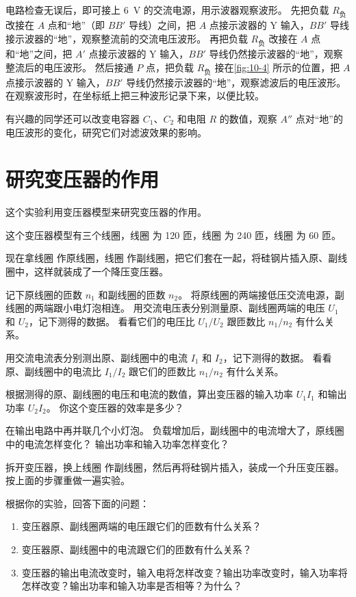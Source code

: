 电路检查无误后，即可接上 \qty{6}{V} 的交流电源，用示波器观察波形。
先把负载 $R_{\text{负}}$ 改接在 $A$ 点和“地”（即 $BB'$ 导线）之间，把 $A$ 点接示波器的 Y 输入，$BB'$ 导线接示波器的“地”，观察整流前的交流电压波形。
再把负载 $R_{\text{负}}$ 改接在 $A$ 点和“地”之间，把 $A'$ 点接示波器的 Y 输入，$BB'$ 导线仍然接示波器的“地”，观察整流后的电压波形。
然后接通 $P$ 点，把负载 $R_{\text{负}}$ 接在\cref{fig:10-4} 所示的位置，把 $A$ 点接示波器的 Y 输入，$BB'$ 导线仍然接示波器的“地”，观察滤波后的电压波形。
在观察波形时，在坐标纸上把三种波形记录下来，以便比较。

有兴趣的同学还可以改变电容器 $C_1$、$C_2$ 和电阻 $R$ 的数值，观察 $A''$ 点对“地”的电压波形的变化，研究它们对滤波效果的影响。

\section{研究变压器的作用}
这个实验利用变压器模型来研究变压器的作用。

这个变压器模型有三个线圈，线圈  为 120 匝，线圈  为 240 匝，线圈  为 60 匝。

现在拿线圈  作原线圈，线圈  作副线圈，把它们套在一起，将硅钢片插入原、副线圈中，这样就装成了一个降压变压器。

记下原线圈的匝数 $n_1$ 和副线圈的匝数 $n_2$。
将原线圈的两端接低压交流电源，副线圈的两端跟小电灯泡相连。
用交流电压表分别测量原、副线圈两端的电压 $U_1$ 和 $U_2$，记下测得的数据。
看看它们的电压比 $U_1/U_2$ 跟匝数比 $n_1/n_2$ 有什么关系。

用交流电流表分别测出原、副线圈中的电流 $I_1$ 和 $I_2$，记下测得的数据。
看看原、副线圈中的电流比 $I_1/I_2$ 跟它们的匝数比 $n_1/n_2$ 有什么关系。

根据测得的原、副线圈的电压和电流的数值，算出变压器的输入功率 $U_1I_1$ 和输出功率 $U_2I_2$。
你这个变压器的效率是多少？

在输出电路中再并联几个小灯泡。
负载增加后，副线圈中的电流增大了，原线圈中的电流怎样变化？
输出功率和输入功率怎样变化？

拆开变压器，换上线圈  作副线圈，然后再将硅钢片插入，装成一个升压变压器。
按上面的步骤重做一遍实验。

根据你的实验，回答下面的问题：
\begin{enumerate}
  \item 变压器原、副线圈两端的电压跟它们的匝数有什么关系？
  \item 变压器原、副线圈中的电流跟它们的匝数有什么关系？
  \item 变压器的输出电流改变时，输入电将怎样改变？输出功率改变时，输入功率将怎样改变？输出功率和输入功率是否相等？为什么？
\end{enumerate}


